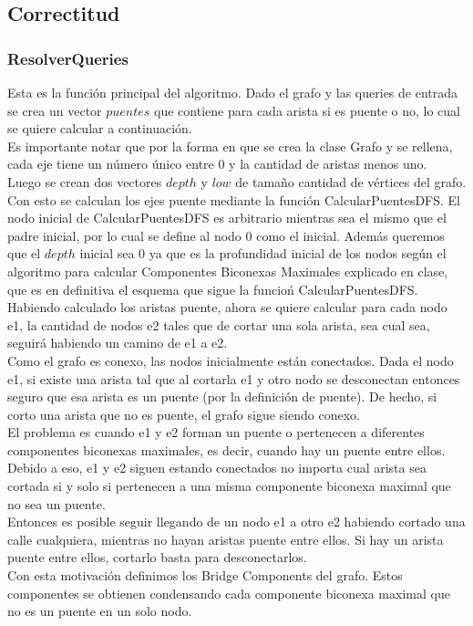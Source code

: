 \subsection{Correctitud}

\subsubsection*{ResolverQueries}
Esta es la función principal del algoritmo. Dado el grafo y las queries de entrada se crea un vector $puentes$ 
que contiene para cada arista si es puente o no, lo cual se quiere calcular a continuaci\'on. \\
Es importante notar que por la forma en que se crea la clase Grafo y se rellena, cada eje tiene un número 
único entre 0 y la cantidad de aristas menos uno. \\
Luego se crean dos vectores $depth$ y $low$ de tamaño cantidad de vértices del grafo. Con esto se calculan los
ejes puente mediante la funci\'on CalcularPuentesDFS. El nodo inicial de CalcularPuentesDFS es arbitrario 
mientras sea el mismo que el padre inicial, por lo cual se define al nodo 0 como el inicial. Además queremos 
que el $depth$ inicial sea 0 ya que es la profundidad inicial de los nodos según el algoritmo para calcular 
Componentes Biconexas Maximales explicado en clase, que es en definitiva el esquema que sigue la funcio\'n 
CalcularPuentesDFS. \\
Habiendo calculado los aristas puente, ahora se quiere calcular para cada nodo e1, la cantidad de nodos e2 
tales que de cortar una sola arista, sea cual sea, seguir\'a habiendo un camino de e1 a e2. \\
Como el grafo es conexo, las nodos inicialmente están conectados. Dada el nodo e1, si existe una arista tal que al 
cortarla e1 y otro nodo se desconectan entonces seguro que esa arista es un puente (por la definición de puente). 
De hecho, si corto una arista que no es puente, el grafo sigue siendo conexo. \\
El problema es cuando e1 y e2 forman un puente o pertenecen a diferentes componentes biconexas maximales, es decir, 
cuando hay un puente entre ellos. Debido a eso, e1 y e2 siguen estando conectados no importa cual arista sea cortada
si y solo si pertenecen a una misma componente biconexa maximal que no sea un puente. \\
Entonces es posible seguir llegando de un nodo e1 a otro e2 habiendo cortado una calle 
cualquiera, mientras no hayan aristas puente entre ellos. Si hay un arista puente entre ellos, cortarlo basta para desconectarlos. \\
Con esta motivación definimos los Bridge Components del grafo. Estos componentes se obtienen condensando cada componente biconexa 
maximal que no es un puente en un solo nodo. \\

